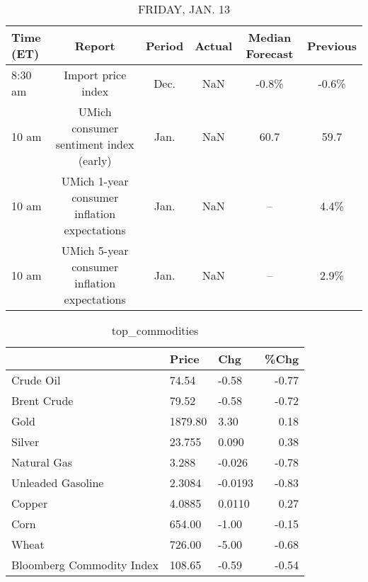 \documentclass{article}%
\begin{document}
%


\begin{table}[htbp]%
\caption{FRIDAY, JAN. 13}%
\centering%
\begin{adjustbox}{width=1\textwidth}%
\begin{tabular}{lccccc}
\toprule
Time (ET) &                                       Report & Period & Actual & Median Forecast & Previous \\
\midrule
  8:30 am &                           Import price index &   Dec. &    NaN &           -0.8\% &    -0.6\% \\
    10 am &       UMich consumer sentiment index (early) &   Jan. &    NaN &            60.7 &     59.7 \\
    10 am & UMich 1-year consumer inflation expectations &   Jan. &    NaN &              -- &     4.4\% \\
    10 am & UMich 5-year consumer inflation expectations &   Jan. &    NaN &              -- &     2.9\% \\
\bottomrule
\end{tabular}
%
\end{adjustbox}%
\end{table}

%


\begin{table}[htbp]%
\caption{top\_commodities}%
\centering%
\begin{adjustbox}{width=1\textwidth}%
\begin{tabular}{lllr}
\toprule
                          &   Price &     Chg &  \%Chg \\
\midrule
               Crude Oil  &   74.54 &   -0.58 & -0.77 \\
             Brent Crude  &   79.52 &   -0.58 & -0.72 \\
                    Gold  & 1879.80 &    3.30 &  0.18 \\
                  Silver  &  23.755 &   0.090 &  0.38 \\
             Natural Gas  &   3.288 &  -0.026 & -0.78 \\
       Unleaded Gasoline  &  2.3084 & -0.0193 & -0.83 \\
                  Copper  &  4.0885 &  0.0110 &  0.27 \\
                    Corn  &  654.00 &   -1.00 & -0.15 \\
                   Wheat  &  726.00 &   -5.00 & -0.68 \\
Bloomberg Commodity Index &  108.65 &   -0.59 & -0.54 \\
\bottomrule
\end{tabular}
%
\end{adjustbox}%
\end{table}
\end{document}
